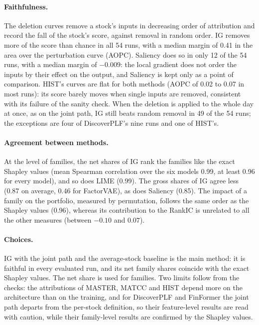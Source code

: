 \paragraph{Faithfulness.} The deletion curves remove a stock's inputs in decreasing order of attribution and record the fall of the stock's score, against removal in random order. IG removes more of the score than chance in all 54 runs, with a median margin of 0.41 in the area over the perturbation curve (AOPC). Saliency does so in only 12 of the 54 runs, with a median margin of $-0.009$: the local gradient does not order the inputs by their effect on the output, and Saliency is kept only as a point of comparison. HIST's curves are flat for both methods (AOPC of 0.02 to 0.07 in most runs): its score barely moves when single inputs are removed, consistent with its failure of the sanity check. When the deletion is applied to the whole day at once, as on the joint path, IG still beats random removal in 49 of the 54 runs; the exceptions are four of DiscoverPLF's nine runs and one of HIST's.

\paragraph{Agreement between methods.} At the level of families, the net shares of IG rank the families like the exact Shapley values (mean Spearman correlation over the six models 0.99, at least 0.96 for every model), and so does LIME (0.99). The gross shares of IG agree less (0.87 on average, 0.46 for FactorVAE), as does Saliency (0.85). The impact of a family on the portfolio, measured by permutation, follows the same order as the Shapley values (0.96), whereas its contribution to the RankIC is unrelated to all the other measures (between $-0.10$ and $0.07$).

\paragraph{Choices.} IG with the joint path and the average-stock baseline is the main method: it is faithful in every evaluated run, and its net family shares coincide with the exact Shapley values. The net share is used for families. Two limits follow from the checks: the attributions of MASTER, MATCC and HIST depend more on the architecture than on the training, and for DiscoverPLF and FinFormer the joint path departs from the per-stock definition, so their feature-level results are read with caution, while their family-level results are confirmed by the Shapley values.

